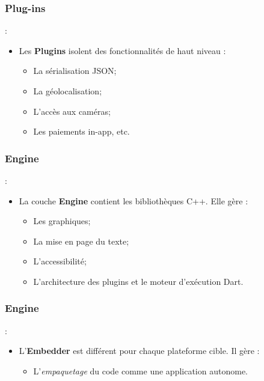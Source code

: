 \documentclass[10pt]{beamer}
\begin{document}
\subsubsection{Plug-ins}
\begin{frame}[fragile,t]{\secname : \subsecname}
    \begin{itemize}
        \item Les \textbf{Plugins} isolent des fonctionnalités de haut niveau :
              \begin{itemize}
                  \item La sérialisation JSON;
                  \item La géolocalisation;
                  \item L'accès aux caméras;
                  \item Les paiements in-app, etc.
              \end{itemize}
    \end{itemize}
\end{frame}

\subsubsection{Engine}
\begin{frame}[fragile,t]{\secname : \subsecname}
    \begin{itemize}
        \item La couche \textbf{Engine} contient les bibliothèques C++. Elle gère :
              \begin{itemize}
                  \item Les graphiques;
                  \item La mise en page du texte;
                  \item L'accessibilité;
                  \item L'architecture des plugins et le moteur d'exécution Dart.
              \end{itemize}
    \end{itemize}
\end{frame}

\subsubsection{Engine}
\begin{frame}[fragile,t]{\secname : \subsecname}
    \begin{itemize}
        \item L'\textbf{Embedder} est différent pour chaque plateforme cible. Il gère :
              \begin{itemize}
                  \item L'\textit{empaquetage} du code comme une application autonome.
              \end{itemize}
    \end{itemize}
\end{frame}
\end{document}
